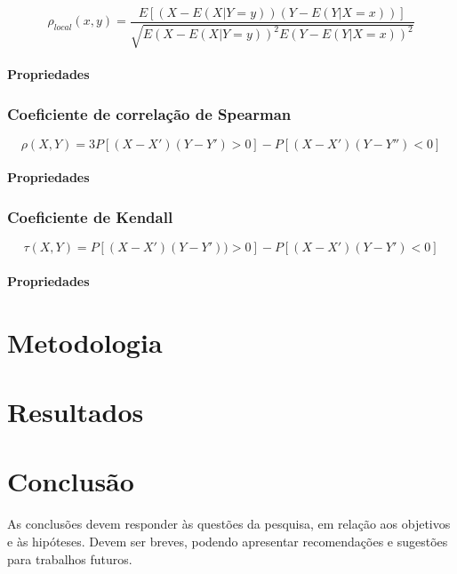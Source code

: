 \documentclass[
	12pt,				%
	oneside,			%
	a4paper,			%
	chapter=TITLE,		%
	section=TITLE,		%
	english,			%
	brazil				%
	]{abntex2}
\begin{document}
\[\rho_{local}(x, y) = \frac{E[(X - E(X|Y = y))(Y - E(Y|X = x))]}{\sqrt{E(X - E(X|Y = y))^2 E(Y - E(Y |X = x))^2}}\]

\subsubsection{Propriedades}\label{propriedades}

\subsection{Coeficiente de correlação de
Spearman}\label{coeficiente-de-correlauxe7uxe3o-de-spearman}

\[\rho(X, Y ) = 3P[(X - X')(Y - Y') > 0] - P[(X - X')(Y - Y'' ) < 0]\]

\subsubsection{Propriedades}\label{propriedades-1}

\subsection{Coeficiente de Kendall}\label{coeficiente-de-kendall}

\[\tau(X, Y ) = P[(X - X')(Y - Y')) > 0] - P[(X - X')(Y - Y') < 0]\]

\subsubsection{Propriedades}\label{propriedades-2}

\hypertarget{metodologia}{\chapter{Metodologia}\label{metodologia}}

\hypertarget{resultados}{\chapter{Resultados}\label{resultados}}

\hypertarget{conclusao}{\chapter{Conclusão}\label{conclusao}}

As conclusões devem responder às questões da pesquisa, em relação aos
objetivos e às hipóteses. Devem ser breves, podendo apresentar
recomendações e sugestões para trabalhos futuros.
\end{document}
